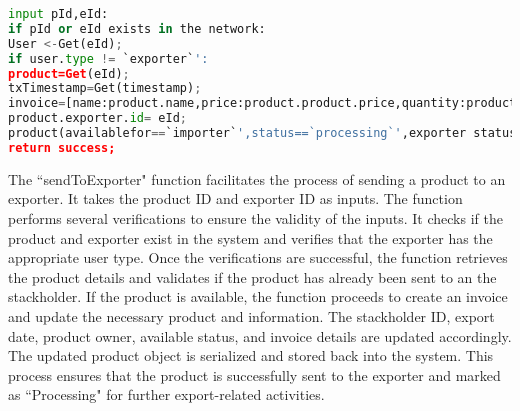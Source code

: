 \begin{lstlisting}[language=Python , caption=send to exporter]
input pId,eId:
if pId or eId exists in the network:
User <-Get(eId);
if user.type != `exporter`':
product=Get(eId);
txTimestamp=Get(timestamp);			 
invoice=[name:product.name,price:product.product.price,quantity:product.product.quantity]
product.exporter.id= eId;
product(availablefor==`importer`',status==`processing`',exporter status==`processing`');
return success;       
\end{lstlisting}
The ``sendToExporter" function facilitates the process of sending a product to an exporter. It takes the product ID and exporter ID as inputs. The function performs several verifications to ensure the validity of the inputs. It checks if the product and exporter exist in the system and verifies that the exporter has the appropriate user type. Once the verifications are successful, the function retrieves the product details and validates if the product has already been sent to an the stackholder. If the product is available, the function proceeds to create an invoice and update the necessary product and information. The stackholder ID, export date, product owner, available status, and invoice details are updated accordingly. The updated product object is serialized and stored back into the system. This process ensures that the product is successfully sent to the exporter and marked as ``Processing" for further export-related activities.